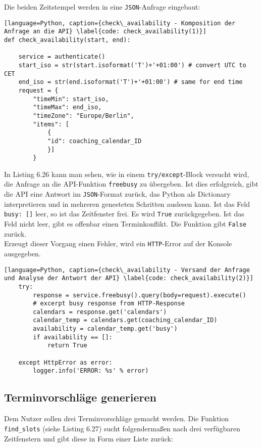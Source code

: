             Die beiden Zeitstempel werden in eine \verb|JSON|-Anfrage eingebaut:
            \begin{lstlisting}[language=Python, caption={check\_availability - Komposition der Anfrage an die API} \label{code: check_availability(1)}]
def check_availability(start, end):

    service = authenticate()
    start_iso = str(start.isoformat('T')+'+01:00') # convert UTC to CET
    end_iso = str(end.isoformat('T')+'+01:00') # same for end time
    request = {
        "timeMin": start_iso,
        "timeMax": end_iso,
        "timeZone": "Europe/Berlin", 
        "items": [
            {
            "id": coaching_calendar_ID
            }]
        }
            \end{lstlisting}

            In Listing 6.26 kann man sehen, wie in einem \verb|try/except|-Block versucht wird, die Anfrage an die API-Funktion \verb|freebusy| zu übergeben. Ist dies erfolgreich, gibt die API eine Antwort im \verb|JSON|-Format zurück, das Python als Dictionary interpretieren und in mehreren genesteten Schritten auslesen kann. Ist das Feld \verb|busy: []| leer, so ist das Zeitfenster frei. Es wird \verb|True| zurückgegeben. Ist das Feld nicht leer, gibt es offenbar einen Terminkonflikt. Die Funktion gibt \verb|False| zurück. \\
            Erzeugt dieser Vorgang einen Fehler, wird ein \verb|HTTP|-Error auf der Konsole ausgegeben. \\

            \begin{lstlisting}[language=Python, caption={check\_availability - Versand der Anfrage und Analyse der Antwort der API} \label{code: check_availability(2)}]
    try:
        response = service.freebusy().query(body=request).execute()    
        # excerpt busy response from HTTP-Response
        calendars = response.get('calendars')
        calendar_temp = calendars.get(coaching_calendar_ID)
        availability = calendar_temp.get('busy')
        if availability == []:
            return True

    except HttpError as error:
        logger.info('ERROR: %s' % error)
                    \end{lstlisting}




        \subsection{Terminvorschläge generieren}
            Dem Nutzer sollen drei Terminvorschläge gemacht werden. Die Funktion \verb|find_slots| (siehe Listing 6.27) sucht folgendermaßen nach drei verfügbaren Zeitfenstern und gibt diese in Form einer Liste zurück: 
            
